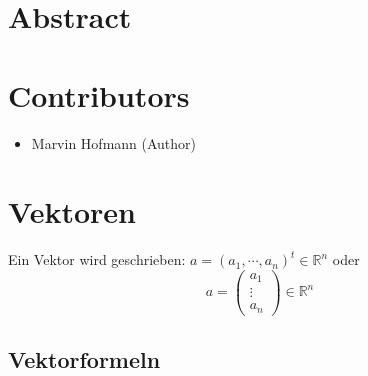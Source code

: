 \documentclass[pdftex,12pt,a4paper,fleqn]{scrartcl}
\title{\doctitle}
\subtitle{\docsubtitle}
\author{\docauthor}
\date{\docdate}
\begin{document}
\tableofcontents 

\section{Abstract} %
\label{sec:abstract}

\begin{abstract} 
Dies ist ein CheatSheet for Mathematik für Informatiker im Sommersemester 2016 an der Universität des Saarlands. 

Mitarbeit jeglicher Art ist gerne gesehen. Du hast einen Fehler entdeckt oder ein Thema fehlt? Dann klick hier \url{https://github.com/UdS-Skripte/MFI-II-CheatSheet} und eröffne eine neue \href{https://github.com/UdS-Skripte/MFI-II-CheatSheet/issues/new}{Issue} oder füge dein Thema selber ein mit einem \href{https://github.com/UdS-Skripte/MFI-II-CheatSheet/compare#fork-destination-box}{Pull\ Request}.

\textbf{Bitte hilf mit, dieses Dokument besser zu machen!}
\end{abstract}


\section{Contributors} %
\label{sec:contributors}

\begin{itemize}
	\item Marvin Hofmann (Author)
\end{itemize}


\newpage

\section{Vektoren} %
\label{sec:vektoren}

Ein Vektor wird geschrieben: $a = (a_1, \cdots, a_n)^t \in \mathbb{R}^n$ oder
$$a = \begin{pmatrix}a_{1}\\\vdots\\a_{n}\end{pmatrix} \in \mathbb{R}^n$$

\subsection{Vektorformeln} %
\label{sub:vektorformeln}
\end{document}
